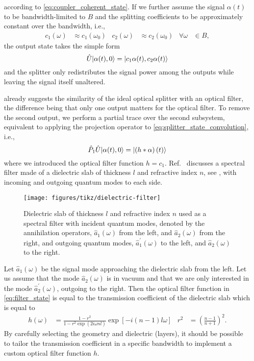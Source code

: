 according to \cref{eq:coupler_coherent_state}.
If we further assume the signal $\alpha(t)$ to be bandwidth-limited to $B$ and the splitting coefficients to be approximately constant over the bandwidth, i.e.,
\begin{align}
	c_1(\omega)
	&\approx
	c_1(\omega_0)
	&
	c_2(\omega)
	&\approx
	c_2(\omega_0)
	&
	\forall
	\omega
	&\in
	B
	,
\end{align}
the output state takes the simple form
\begin{equation}
	\hat{U}
	\ket*{\alpha(t),0}
	=
	\ket*{c_1\alpha(t),c_2\alpha(t)}
\end{equation}
and the splitter only redistributes the signal power among the outputs while leaving the signal itself unaltered.

 already suggests the similarity of the ideal optical splitter with an optical filter, the difference being that only one output matters for the optical filter.
To remove the second output, we perform a partial trace over the second subsystem, equivalent to applying the projection operator to \cref{eq:splitter_state_convolution}, i.e.,
\begin{equation}
	\hat{P}_1
	\hat{U}
	\ket*{\alpha(t),0}
	=
	\ket*{\left(h*\alpha\right)(t)}
	\label{eq:filter_state}
\end{equation}
where we introduced the optical filter function $h=c_1$.
Ref.~\cite[p.~199]{Vogel2006} discusses a spectral filter made of a dielectric slab of thickness $l$ and refractive index $n$, see , with incoming and outgoing quantum modes to each side.
\begin{figure}[htb]
    \centering
    \texttt{[image: figures/tikz/dielectric-filter]}
    \caption{Dielectric slab of thickness $l$ and refractive index $n$ used as a spectral filter with incident quantum modes, denoted by the annihilation operators, $\hat{a}_1(\omega)$ from the left, and $\hat{a}_2(\omega)$ from the right, and outgoing quantum modes, $\hat{a}_1^\prime(\omega)$ to the left, and $\hat{a}_2(\omega)$ to the right.}\label{fig:dielectric_filter}
\end{figure}
Let $\hat{a}_1(\omega)$ be the signal mode approaching the dielectric slab from the left.
Let us assume that the mode $\hat{a}_2(\omega)$ is in vacuum and that we are only interested in the mode $\hat{a}_2^\prime(\omega)$, outgoing to the right.
Then the optical filter function in \cref{eq:filter_state} is equal to the transmission coefficient of the dielectric slab which is equal to~\cite[p.~199]{Vogel2006}
\begin{align}
	h(\omega)
	&=
	\frac{1-r^2}{1-r^2\exp(2i\omega nl)}
	\exp\left[-i(n-1)l\omega\right]
	&
	r^2
	&=
	\left(\frac{n-1}{n+1}\right)^2
	.
\end{align}
By carefully selecting the geometry and dielectric (layers), it should be possible to tailor the transmission coefficient in a specific bandwidth to implement a custom optical filter function $h$.